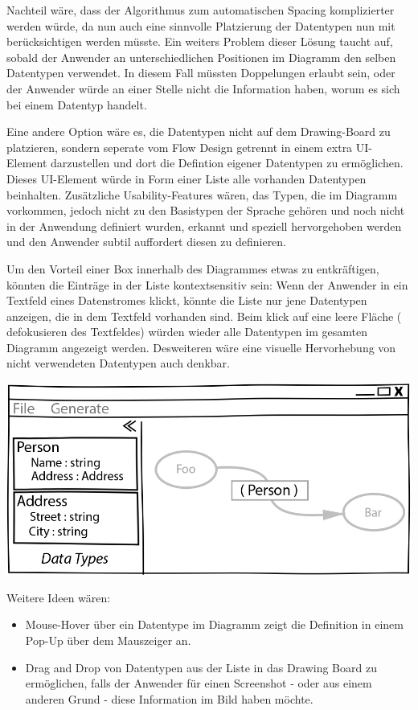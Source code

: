 \documentclass[a4paper,12pt,oneside]{book}
\begin{document}
Nachteil wäre, dass der Algorithmus zum automatischen Spacing komplizierter
werden würde, da nun auch eine sinnvolle Platzierung der Datentypen nun mit
berücksichtigen werden müsste.
Ein weiters Problem dieser Lösung taucht auf, sobald der Anwender an unterschiedlichen
Positionen im Diagramm den selben Datentypen verwendet. In diesem Fall müssten Doppelungen erlaubt
sein, oder der Anwender würde an einer Stelle nicht die Information haben, worum
es sich bei einem Datentyp handelt.

Eine andere Option wäre es, die Datentypen nicht auf dem Drawing-Board zu
platzieren, sondern seperate vom Flow Design getrennt in einem extra UI-Element
darzustellen und dort die Defintion eigener Datentypen zu ermöglichen.
Dieses UI-Element würde in Form einer Liste alle vorhanden Datentypen
beinhalten. Zusätzliche Usability-Features wären, das Typen, die im Diagramm
vorkommen, jedoch nicht zu den Basistypen der Sprache gehören und noch nicht in
der Anwendung definiert wurden, erkannt und speziell hervorgehoben werden und
den Anwender subtil auffordert diesen zu definieren.

Um den Vorteil einer Box innerhalb des Diagrammes etwas zu entkräftigen, könnten
die Einträge in der Liste kontextsensitiv sein: Wenn der Anwender in ein
Textfeld eines Datenstromes klickt, könnte die Liste nur jene Datentypen
anzeigen, die in dem Textfeld vorhanden sind. Beim klick auf eine leere Fläche (
defokusieren des Textfeldes) würden wieder alle Datentypen im gesamten Diagramm
angezeigt werden. Desweiteren wäre eine visuelle Hervorhebung von nicht
verwendeten Datentypen auch denkbar.
\bigskip

\includegraphics[width=.9\linewidth]{./img/DatatypesCrop.jpg}


Weitere Ideen wären: 
\begin{itemize}
\item Mouse-Hover über ein Datentype im Diagramm zeigt die Definition in einem Pop-Up
über dem Mauszeiger an.
\item Drag and Drop von Datentypen aus der Liste in das Drawing Board zu
ermöglichen, falls der Anwender für einen Screenshot - oder aus einem anderen
Grund - diese Information im Bild haben möchte.
\end{itemize}
\end{document}
